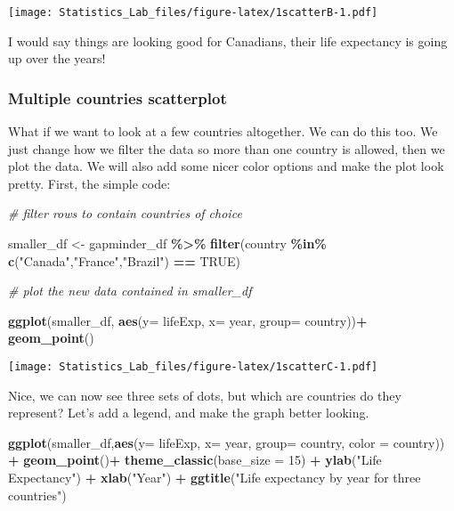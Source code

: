 \documentclass[
]{book}
\newenvironment{Shaded}{\begin{snugshade}}{\end{snugshade}}
\newcommand{\AttributeTok}[1]{\textcolor[rgb]{0.13,0.29,0.53}{#1}}
\newcommand{\CommentTok}[1]{\textcolor[rgb]{0.56,0.35,0.01}{\textit{#1}}}
\newcommand{\ConstantTok}[1]{\textcolor[rgb]{0.56,0.35,0.01}{#1}}
\newcommand{\DecValTok}[1]{\textcolor[rgb]{0.00,0.00,0.81}{#1}}
\newcommand{\FunctionTok}[1]{\textcolor[rgb]{0.13,0.29,0.53}{\textbf{#1}}}
\newcommand{\NormalTok}[1]{#1}
\newcommand{\OtherTok}[1]{\textcolor[rgb]{0.56,0.35,0.01}{#1}}
\newcommand{\SpecialCharTok}[1]{\textcolor[rgb]{0.81,0.36,0.00}{\textbf{#1}}}
\newcommand{\StringTok}[1]{\textcolor[rgb]{0.31,0.60,0.02}{#1}}
\begin{document}
\texttt{[image: Statistics\_Lab\_files/figure-latex/1scatterB-1.pdf]}

I would say things are looking good for Canadians, their life expectancy is going up over the years!

\hypertarget{multiple-countries-scatterplot}{%
\subsubsection{Multiple countries scatterplot}\label{multiple-countries-scatterplot}}

What if we want to look at a few countries altogether. We can do this too. We just change how we filter the data so more than one country is allowed, then we plot the data. We will also add some nicer color options and make the plot look pretty. First, the simple code:

\begin{Shaded}
\begin{Highlighting}[]
\CommentTok{\# filter rows to contain countries of choice}

\NormalTok{smaller\_df }\OtherTok{\textless{}{-}}\NormalTok{ gapminder\_df }\SpecialCharTok{\%\textgreater{}\%} 
                 \FunctionTok{filter}\NormalTok{(country }\SpecialCharTok{\%in\%} \FunctionTok{c}\NormalTok{(}\StringTok{"Canada"}\NormalTok{,}\StringTok{"France"}\NormalTok{,}\StringTok{"Brazil"}\NormalTok{) }\SpecialCharTok{==} \ConstantTok{TRUE}\NormalTok{)}

\CommentTok{\# plot the new data contained in smaller\_df}

\FunctionTok{ggplot}\NormalTok{(smaller\_df, }\FunctionTok{aes}\NormalTok{(}\AttributeTok{y=}\NormalTok{ lifeExp, }\AttributeTok{x=}\NormalTok{ year, }\AttributeTok{group=}\NormalTok{ country))}\SpecialCharTok{+}
  \FunctionTok{geom\_point}\NormalTok{()}
\end{Highlighting}
\end{Shaded}

\texttt{[image: Statistics\_Lab\_files/figure-latex/1scatterC-1.pdf]}

Nice, we can now see three sets of dots, but which are countries do they represent? Let's add a legend, and make the graph better looking.

\begin{Shaded}
\begin{Highlighting}[]
\FunctionTok{ggplot}\NormalTok{(smaller\_df,}\FunctionTok{aes}\NormalTok{(}\AttributeTok{y=}\NormalTok{ lifeExp, }\AttributeTok{x=}\NormalTok{ year, }
                      \AttributeTok{group=}\NormalTok{ country, }\AttributeTok{color =}\NormalTok{ country)) }\SpecialCharTok{+}
  \FunctionTok{geom\_point}\NormalTok{()}\SpecialCharTok{+} 
  \FunctionTok{theme\_classic}\NormalTok{(}\AttributeTok{base\_size =} \DecValTok{15}\NormalTok{) }\SpecialCharTok{+}
  \FunctionTok{ylab}\NormalTok{(}\StringTok{"Life Expectancy"}\NormalTok{) }\SpecialCharTok{+} 
  \FunctionTok{xlab}\NormalTok{(}\StringTok{"Year"}\NormalTok{) }\SpecialCharTok{+}
  \FunctionTok{ggtitle}\NormalTok{(}\StringTok{"Life expectancy by year for three countries"}\NormalTok{)}
\end{Highlighting}
\end{Shaded}
\end{document}
